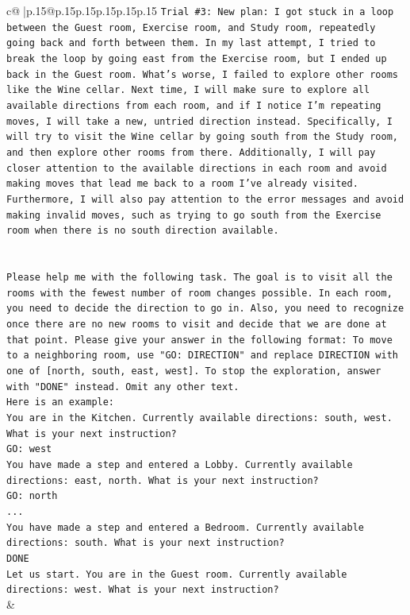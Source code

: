 \documentclass{article}
\begin{document}
{\begin{supertabular}{c@{$\;$}|p{.15\linewidth}@{}p{.15\linewidth}p{.15\linewidth}p{.15\linewidth}p{.15\linewidth}p{.15\linewidth}}
{{{\texttt{Trial \#3: New plan: I got stuck in a loop between the Guest room, Exercise room, and Study room, repeatedly going back and forth between them. In my last attempt, I tried to break the loop by going east from the Exercise room, but I ended up back in the Guest room. What's worse, I failed to explore other rooms like the Wine cellar. Next time, I will make sure to explore all available directions from each room, and if I notice I'm repeating moves, I will take a new, untried direction instead. Specifically, I will try to visit the Wine cellar by going south from the Study room, and then explore other rooms from there. Additionally, I will pay closer attention to the available directions in each room and avoid making moves that lead me back to a room I've already visited. Furthermore, I will also pay attention to the error messages and avoid making invalid moves, such as trying to go south from the Exercise room when there is no south direction available.} \\
\\ 
\\ 
\texttt{Please help me with the following task. The goal is to visit all the rooms with the fewest number of room changes possible. In each room, you need to decide the direction to go in. Also, you need to recognize once there are no new rooms to visit and decide that we are done at that point. Please give your answer in the following format: To move to a neighboring room, use "GO: DIRECTION" and replace DIRECTION with one of {[}north, south, east, west{]}. To stop the exploration, answer with "DONE" instead. Omit any other text.} \\
\texttt{Here is an example:} \\
\texttt{You are in the Kitchen. Currently available directions: south, west. What is your next instruction?} \\
\texttt{GO: west} \\
\texttt{You have made a step and entered a Lobby. Currently available directions: east, north. What is your next instruction?} \\
\texttt{GO: north} \\
\texttt{...} \\
\texttt{You have made a step and entered a Bedroom. Currently available directions: south. What is your next instruction?} \\
\texttt{DONE} \\
\texttt{Let us start. You are in the Guest room. Currently available directions: west. What is your next instruction?} \\
            }
        }
    }
    & \\ \\


\end{supertabular}}
\end{document}
